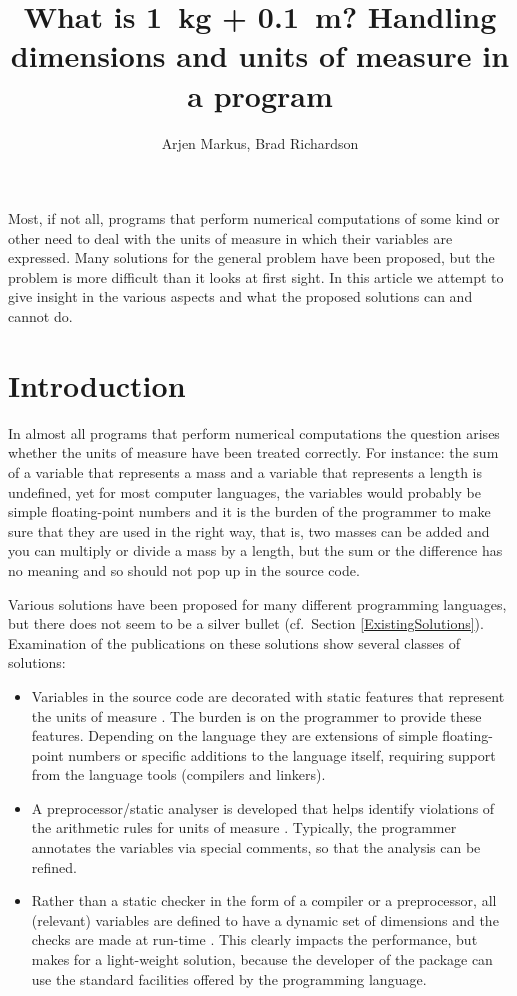 \documentclass{article}
\begin{document}
\title{What is 1~kg + 0.1~m? Handling dimensions and units of measure in a program}

\author{Arjen Markus, Brad Richardson}

\maketitle

\abstract
Most, if not all, programs that perform numerical computations of some kind or other need to deal with
the units of measure in which their variables are expressed. Many solutions for the general problem
have been proposed, but the problem is more difficult than it looks at first sight. In this article we
attempt to give insight in the various aspects and what the proposed solutions can and cannot do.

\section{Introduction}
In almost all programs that perform numerical computations the question arises whether the units of measure have
been treated correctly. For instance: the sum of a variable that represents a mass and a variable that represents
a length is undefined, yet for most computer languages, the variables would probably be simple floating-point
numbers and it is the burden of the programmer to make sure that they are used in the right way, that is,
two masses can be added and you can multiply or divide a mass by a length, but the sum or the difference has no meaning
and so should not pop up in the source code.

Various solutions have been proposed for many different programming languages, but there does not seem to be a
silver bullet (cf.\ Section \ref{ExistingSolutions}). Examination of the publications on these solutions show several
classes of solutions:
\begin{itemize}
\item
Variables in the source code are decorated with static features that represent the units of measure
\cite{DimensionalityCheckingAda, BlogAdaPhysicalUnitsGeneric, QuaffFortranPackage, PhysicalEngineeringUnitsN2113}. The burden is
on the programmer to provide these features. Depending on the language they are extensions of simple floating-point numbers
or specific additions to the language itself, requiring support from the language tools (compilers and linkers).
\item
A preprocessor/static analyser is developed that helps identify violations of the arithmetic rules for units of measure
\cite{SimConFPTCheckingUnits}.
Typically, the programmer annotates the variables via special comments, so that the analysis can be refined.
\item
Rather than a static checker in the form of a compiler or a preprocessor, all (relevant) variables are defined to have
a dynamic set of dimensions and the checks are made at run-time \cite{PhysUnitsPetty}. This clearly impacts the performance, but makes for
a light-weight solution, because the developer of the package can use the standard facilities offered by the programming
language.
\end{itemize}
\end{document}
